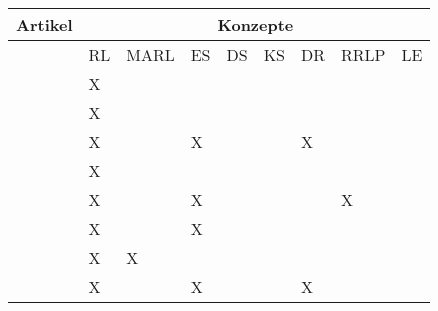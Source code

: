 \begin{longtable}{|l|llllllll|}
    \hline
    \multicolumn{1}{|c|}{Artikel} & \multicolumn{8}{c|}{Konzepte}                                                                                                                                                                \\ \hline
    \endhead
                                  & \multicolumn{1}{l|}{RL} & \multicolumn{1}{l|}{MARL} & \multicolumn{1}{l|}{ES} & \multicolumn{1}{l|}{DS} & \multicolumn{1}{l|}{KS} & \multicolumn{1}{l|}{DR} & \multicolumn{1}{l|}{RRLP} & LE \\ \hline
    \cite[]{Sutton.2018}          & \multicolumn{1}{l|}{X}   & \multicolumn{1}{l|}{}     & \multicolumn{1}{l|}{}   & \multicolumn{1}{l|}{}   & \multicolumn{1}{l|}{}   & \multicolumn{1}{l|}{}   & \multicolumn{1}{l|}{}     &    \\ \hline
    \cite[]{Li.2019}              & \multicolumn{1}{l|}{X}   & \multicolumn{1}{l|}{}     & \multicolumn{1}{l|}{}   & \multicolumn{1}{l|}{}   & \multicolumn{1}{l|}{}   & \multicolumn{1}{l|}{}   & \multicolumn{1}{l|}{}     &    \\ \hline
    \cite[]{Zhao.2020}            & \multicolumn{1}{l|}{X}   & \multicolumn{1}{l|}{}     & \multicolumn{1}{l|}{X}   & \multicolumn{1}{l|}{}   & \multicolumn{1}{l|}{}   & \multicolumn{1}{l|}{X}   & \multicolumn{1}{l|}{}     &    \\ \hline
    \cite[]{Wang.2020}            & \multicolumn{1}{l|}{X}   & \multicolumn{1}{l|}{}     & \multicolumn{1}{l|}{}   & \multicolumn{1}{l|}{}   & \multicolumn{1}{l|}{}   & \multicolumn{1}{l|}{}   & \multicolumn{1}{l|}{}     &    \\ \hline
    \cite[]{Zhang.2018}           & \multicolumn{1}{l|}{X}   & \multicolumn{1}{l|}{}     & \multicolumn{1}{l|}{X}   & \multicolumn{1}{l|}{}   & \multicolumn{1}{l|}{}   & \multicolumn{1}{l|}{}   & \multicolumn{1}{l|}{X}     &    \\ \hline
    \cite[]{Cutler.2014}          & \multicolumn{1}{l|}{X}   & \multicolumn{1}{l|}{}     & \multicolumn{1}{l|}{X}   & \multicolumn{1}{l|}{}   & \multicolumn{1}{l|}{}   & \multicolumn{1}{l|}{}   & \multicolumn{1}{l|}{}     &    \\ \hline
    \cite[]{Canese.2021}          & \multicolumn{1}{l|}{X}   & \multicolumn{1}{l|}{X}    & \multicolumn{1}{l|}{}   & \multicolumn{1}{l|}{}   & \multicolumn{1}{l|}{}   & \multicolumn{1}{l|}{}   & \multicolumn{1}{l|}{}     &    \\ \hline
    \cite[]{Reda.2020}            & \multicolumn{1}{l|}{X}   & \multicolumn{1}{l|}{}     & \multicolumn{1}{l|}{X}   & \multicolumn{1}{l|}{}   & \multicolumn{1}{l|}{}   & \multicolumn{1}{l|}{X}   & \multicolumn{1}{l|}{}     &    \\ \hline

\end{longtable}
